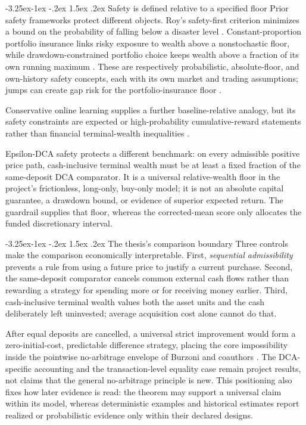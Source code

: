 \documentclass[12pt,a4paper,oneside]{report}
\makeatletter
\renewcommand\subsection{\@startsection{subsection}{2}{\z@}%
  {-3.25ex\@plus -1ex \@minus -.2ex}%
  {1.5ex \@plus .2ex}%
  {\normalfont\fontsize{12}{15}\selectfont\bfseries}}
\makeatother
\begin{document}
\subsection{Safety is defined relative to a specified floor}
\label{sec:lit-safety-objectives}
Prior safety frameworks protect different objects. Roy's safety-first criterion
minimizes a bound on the probability of falling below a disaster level
\citep{roy1952}. Constant-proportion portfolio insurance links risky exposure
to wealth above a nonstochastic floor, while drawdown-constrained portfolio
choice keeps wealth above a fraction of its own running maximum
\citep{blackperold1992,grossmanzhou1993}. These are respectively probabilistic,
absolute-floor, and own-history safety concepts, each with its own market and
trading assumptions; jumps can create gap risk for the portfolio-insurance
floor \citep{conttankov2009}.

Conservative online learning supplies a further baseline-relative analogy, but
its safety constraints are expected or high-probability cumulative-reward
statements rather than financial terminal-wealth inequalities \citep{wu2016}.

Epsilon-DCA safety protects a different benchmark: on every admissible positive
price path, cash-inclusive terminal wealth must be at least a fixed fraction of
the same-deposit DCA comparator. It is a universal relative-wealth floor in the
project's frictionless, long-only, buy-only model; it is not an absolute capital
guarantee, a drawdown bound, or evidence of superior expected return. The
guardrail supplies that floor, whereas the corrected-mean score only allocates
the funded discretionary interval.

\subsection{The thesis's comparison boundary}
\label{sec:lit-project-boundary}
Three controls make the comparison economically interpretable. First,
\emph{sequential admissibility} prevents a rule from using a future price to
justify a current purchase. Second, the same-deposit comparator cancels common
external cash flows rather than rewarding a strategy for spending more or for
receiving money earlier. Third, cash-inclusive terminal wealth values both the
asset units and the cash deliberately left uninvested; average acquisition cost
alone cannot do that.

After equal deposits are cancelled, a universal strict improvement would form
a zero-initial-cost, predictable difference strategy, placing the core
impossibility inside the pointwise no-arbitrage envelope of Burzoni and
coauthors \citep{burzoni2019}. The DCA-specific accounting and the
transaction-level equality case remain project results, not claims that the
general no-arbitrage principle is new. This positioning also fixes how later
evidence is read: the theorem may support a universal claim within its model,
whereas deterministic examples and historical estimates report realized or
probabilistic evidence only within their declared designs.
\end{document}
